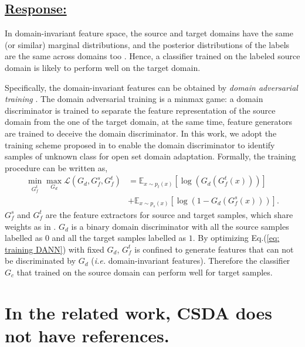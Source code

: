 \subsection*{\underline{\textbf{Response:}}}

In domain-invariant feature space, the source and target domains have the same (or similar) marginal distributions, and the posterior distributions of the labels are the same across domains too \cite{DeepDomainConfusion}.
Hence, a classifier trained on the labeled source domain is likely to perform well on the target domain.

Specifically, the domain-invariant features can be obtained by \textit{domain adversarial training} \cite{DomainAdversrialNetwork,ADDA,OpensetDA-bp}.
The domain adversarial training is a minmax game: a domain discriminator is trained to separate the feature representation of the source domain from the one of the target domain, at the same time, feature generators are trained to deceive the domain discriminator.
In this work, we adopt the training scheme proposed in \cite{OpensetDA-bp} to enable the domain discriminator to identify samples of unknown class for open set domain adaptation.
Formally, the training procedure can be written as,
\begin{equation}
    \label{eq: training DANN}
    \begin{split}
        \min_{G_f^t} \max_{G_d} \mathscr{L}(G_d,G^{s}_{f},G_f^t) &=\mathbb{E}_{x\sim p_t(x)} \left[ \log \left(G_d\left(G_f^t\left(x\right)\right)\right) \right]\\
        &+\mathbb{E}_{x\sim p_s(x)}\left[ \log \left(1-G_d\left(G_f^s\left(x\right)\right)\right) \right].
    \end{split}
\end{equation}
$G_f^s$ and $G_f^t$ are the feature extractors for source and target samples, which share weights as in \cite{OpensetDA-bp}.
$G_d$ is a binary domain discriminator with all the source samples labelled as $0$ and all the target samples labelled as $1$.
By optimizing Eq.(\ref{eq: training DANN}) with fixed $G_d$, $G_f^t$ is confined to generate features that can not be discriminated by $G_d$ (\textit{i.e.} domain-invariant features).
Therefore the classifier $G_c$ that trained on the source domain can perform well for target samples.

\section{In the related work, CSDA does not have references.}

